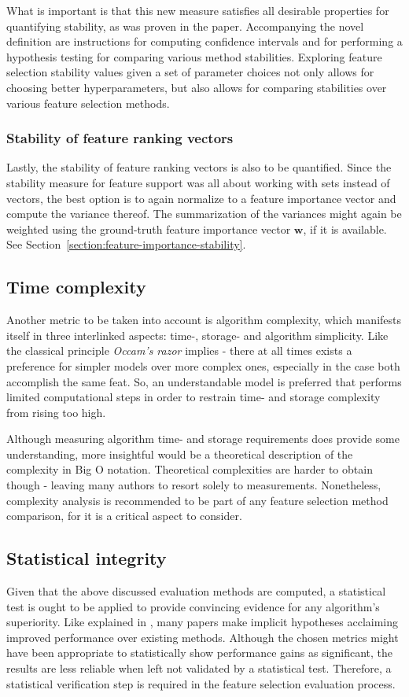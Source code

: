\documentclass{article}
\begin{document}
What is important is that this new measure satisfies all desirable properties for quantifying stability, as was proven in the paper. Accompanying the novel definition are instructions for computing confidence intervals and for performing a hypothesis testing for comparing various method stabilities. Exploring feature selection stability values given a set of parameter choices not only allows for choosing better hyperparameters, but also allows for comparing stabilities over various feature selection methods.

\subsubsection{Stability of feature ranking vectors}
Lastly, the stability of feature ranking vectors is also to be quantified. Since the stability measure for feature support was all about working with sets instead of vectors, the best option is to again normalize to a feature importance vector and compute the variance thereof. The summarization of the variances might again be weighted using the ground-truth feature importance vector $\boldsymbol{w}$, if it is available. See Section~\ref{section:feature-importance-stability}.

\subsection{Time complexity}
Another metric to be taken into account is algorithm complexity, which manifests itself in three interlinked aspects: time-, storage- and algorithm simplicity. Like the classical principle \textit{Occam's razor} implies - there at all times exists a preference for simpler models over more complex ones, especially in the case both accomplish the same feat. So, an understandable model is preferred that performs limited computational steps in order to restrain time- and storage complexity from rising too high.

Although measuring algorithm time- and storage requirements does provide some understanding, more insightful would be a theoretical description of the complexity in Big O notation. Theoretical complexities are harder to obtain though - leaving many authors to resort solely to measurements. Nonetheless, complexity analysis is recommended to be part of any feature selection method comparison, for it is a critical aspect to consider.

\subsection{Statistical integrity}
Given that the above discussed evaluation methods are computed, a statistical test is ought to be applied to provide convincing evidence for any algorithm's superiority. Like explained in \citep{demsar_statistical_2006}, many papers make implicit hypotheses acclaiming improved performance over existing methods. Although the chosen metrics might have been appropriate to statistically show performance gains as significant, the results are less reliable when left not validated by a statistical test. Therefore, a statistical verification step is required in the feature selection evaluation process.
\end{document}
